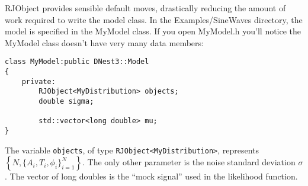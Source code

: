 \documentclass[a4paper, 11pt]{article}
\begin{document}
RJObject provides sensible default moves, drastically reducing the amount of
work required to write the model class. In the Examples/SineWaves directory,
the model is specified in the MyModel class. If you open MyModel.h you'll
notice the MyModel class doesn't have very many data members:

\begin{framed}
\begin{verbatim}
class MyModel:public DNest3::Model
{
    private:
        RJObject<MyDistribution> objects;
        double sigma;

        std::vector<long double> mu;
}
\end{verbatim}
\end{framed}

The variable {\tt objects}, of type {\tt RJObject<MyDistribution>}, represents
$\left\{N, \{A_i, T_i, \phi_i\}_{i=1}^N\right\}$. The only other parameter
is the noise standard deviation $\sigma$. The vector of long doubles is
the ``mock signal'' used in the likelihood function.
\end{document}

